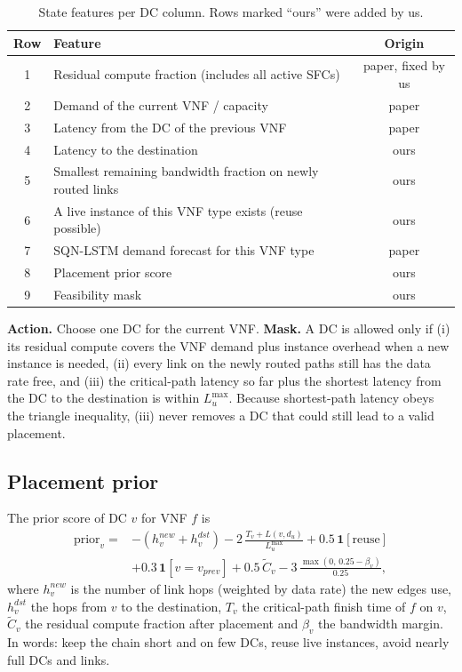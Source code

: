 \documentclass[11pt,a4paper]{article}
\newcommand{\ours}[1]{\textcolor[HTML]{1B7F5A}{#1}}
\begin{document}
\begin{table}[H]
\centering\small
\caption{State features per DC column. Rows marked ``ours'' were added by us.}
\label{tab:state}
\begin{tabular}{clc}
\toprule
Row & Feature & Origin \\
\midrule
1 & Residual compute fraction (includes all active SFCs) & paper, fixed by us \\
2 & Demand of the current VNF / capacity & paper \\
3 & Latency from the DC of the previous VNF & paper \\
4 & Latency to the destination & \ours{ours} \\
5 & Smallest remaining bandwidth fraction on newly routed links & \ours{ours} \\
6 & A live instance of this VNF type exists (reuse possible) & \ours{ours} \\
7 & SQN-LSTM demand forecast for this VNF type & paper \\
8 & Placement prior score & \ours{ours} \\
9 & Feasibility mask & \ours{ours} \\
\bottomrule
\end{tabular}
\end{table}

\textbf{Action.} Choose one DC for the current VNF. \textbf{Mask.} A DC is
allowed only if (i) its residual compute covers the VNF demand plus instance
overhead when a new instance is needed, (ii) every link on the newly routed
paths still has the data rate free, and (iii) the critical-path latency so far
plus the shortest latency from the DC to the destination is within $L^{\max}_u$.
Because shortest-path latency obeys the triangle inequality, (iii) never removes
a DC that could still lead to a valid placement.

\subsection{Placement prior}
The prior score of DC $v$ for VNF $f$ is
\begin{equation}
\begin{split}
\text{prior}_v ={}& -(h^{new}_v + h^{dst}_v) - 2\,\frac{T_v + L(v,d_u)}{L^{\max}_u}
 + 0.5\,\mathbf{1}[\text{reuse}] \\
 & + 0.3\,\mathbf{1}[v = v_{prev}] + 0.5\,\tilde{C}_v - 3\,\frac{\max(0,\,0.25-\beta_v)}{0.25},
\end{split}
\end{equation}
where $h^{new}_v$ is the number of link hops (weighted by data rate) the new
edges use, $h^{dst}_v$ the hops from $v$ to the destination, $T_v$ the
critical-path finish time of $f$ on $v$, $\tilde C_v$ the residual compute
fraction after placement and $\beta_v$ the bandwidth margin. In words: keep the
chain short and on few DCs, reuse live instances, avoid nearly full DCs and
links.
\end{document}
